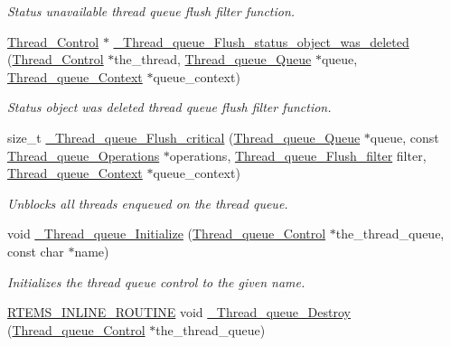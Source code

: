 \begin{DoxyCompactItemize}
\begin{DoxyCompactList}\small\item\em Status unavailable thread queue flush filter function. \end{DoxyCompactList}\item 
\mbox{\hyperlink{struct__Thread__Control}{Thread\+\_\+\+Control}} $\ast$ \mbox{\hyperlink{group__RTEMSScoreThreadQueue_gac33b5b4a755484ecff2e1f72a56be373}{\+\_\+\+Thread\+\_\+queue\+\_\+\+Flush\+\_\+status\+\_\+object\+\_\+was\+\_\+deleted}} (\mbox{\hyperlink{struct__Thread__Control}{Thread\+\_\+\+Control}} $\ast$the\+\_\+thread, \mbox{\hyperlink{structThread__queue__Queue}{Thread\+\_\+queue\+\_\+\+Queue}} $\ast$queue, \mbox{\hyperlink{structThread__queue__Context}{Thread\+\_\+queue\+\_\+\+Context}} $\ast$queue\+\_\+context)
\begin{DoxyCompactList}\small\item\em Status object was deleted thread queue flush filter function. \end{DoxyCompactList}\item 
size\+\_\+t \mbox{\hyperlink{group__RTEMSScoreThreadQueue_gac979e73bbbb59a3157ebd782ff70df0c}{\+\_\+\+Thread\+\_\+queue\+\_\+\+Flush\+\_\+critical}} (\mbox{\hyperlink{structThread__queue__Queue}{Thread\+\_\+queue\+\_\+\+Queue}} $\ast$queue, const \mbox{\hyperlink{structThread__queue__Operations}{Thread\+\_\+queue\+\_\+\+Operations}} $\ast$operations, \mbox{\hyperlink{group__RTEMSScoreThreadQueue_ga66aee78bfdca4bd829cdedf18e7c2451}{Thread\+\_\+queue\+\_\+\+Flush\+\_\+filter}} filter, \mbox{\hyperlink{structThread__queue__Context}{Thread\+\_\+queue\+\_\+\+Context}} $\ast$queue\+\_\+context)
\begin{DoxyCompactList}\small\item\em Unblocks all threads enqueued on the thread queue. \end{DoxyCompactList}\item 
void \mbox{\hyperlink{group__RTEMSScoreThreadQueue_gae839c93467db7f3bb1776323a17ac8ad}{\+\_\+\+Thread\+\_\+queue\+\_\+\+Initialize}} (\mbox{\hyperlink{structThread__queue__Control}{Thread\+\_\+queue\+\_\+\+Control}} $\ast$the\+\_\+thread\+\_\+queue, const char $\ast$name)
\begin{DoxyCompactList}\small\item\em Initializes the thread queue control to the given name. \end{DoxyCompactList}\item 
\mbox{\hyperlink{group__RTEMSScoreBaseDefs_gac216239df231d5dbd15e3520b0b9313f}{R\+T\+E\+M\+S\+\_\+\+I\+N\+L\+I\+N\+E\+\_\+\+R\+O\+U\+T\+I\+NE}} void \mbox{\hyperlink{group__RTEMSScoreThreadQueue_gaa59fb38f22e409d05123df6627ead47a}{\+\_\+\+Thread\+\_\+queue\+\_\+\+Destroy}} (\mbox{\hyperlink{structThread__queue__Control}{Thread\+\_\+queue\+\_\+\+Control}} $\ast$the\+\_\+thread\+\_\+queue)

\end{DoxyCompactItemize}
